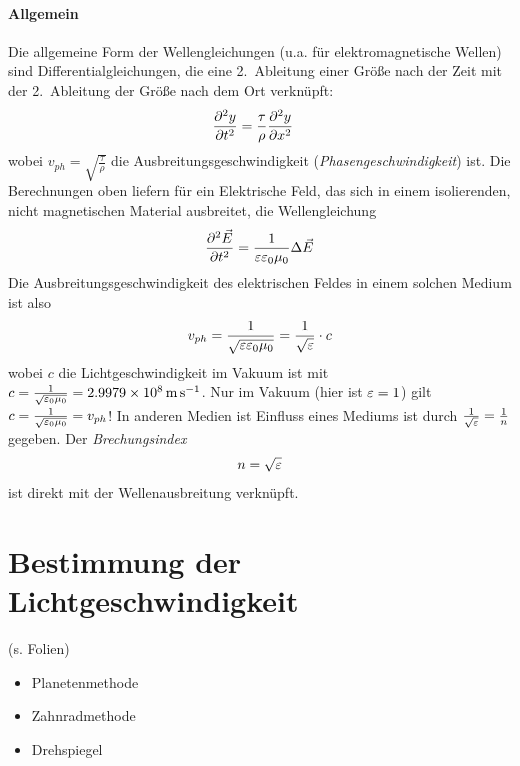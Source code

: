 \paragraph{Allgemein} 
Die allgemeine Form der Wellengleichungen (u.a. für elektromagnetische
Wellen) sind Differentialgleichungen, die eine 2.~Ableitung einer Größe nach der Zeit mit der
2.~Ableitung der Größe nach dem Ort verknüpft: 
\begin{align*}
  \diff[y]{t}&=\frac{\tau}{\rho}\diff[y]{x}
\end{align*}
wobei $v_{ph}=\sqrt{\frac{\tau}{\rho}}$ die Ausbreitungsgeschwindigkeit
(\emph{Phasengeschwindigkeit})%
%
%
ist. 
Die Berechnungen oben liefern für ein Elektrische Feld,
das sich in einem isolierenden, nicht magnetischen Material
ausbreitet, die Wellengleichung
\begin{gather}
  \diff[\vecE]{t} = \frac{1}{\varepsilon\varepsilon_0\mu_0} 
  \Delta \vecE
  \label{elektrWG}
\end{gather}
Die Ausbreitungsgeschwindigkeit des elektrischen Feldes in einem
solchen Medium ist also
\begin{gather*}
  v_{ph} = \frac{1}{\sqrt{\eps\epso\muo}}
  =\frac{1}{\sqrt{\eps}}\cdot c
\end{gather*}
wobei $c$ die Lichtgeschwindigkeit im Vakuum%
 ist mit
$c=\frac{1}{\sqrt{\epso\muo}}=\SI{2.9979e8}{\m\per\s}$.
 Nur im Vakuum (hier ist $\eps = 1$) gilt
$c=\frac{1}{\sqrt{\epso\muo}}=v_{ph}$!
In anderen Medien ist Einfluss eines Mediums ist durch
$\frac{1}{\sqrt{\eps}}=\frac{1}{n}$ gegeben. 
Der \emph{Brechungsindex} 
\begin{gather*}
  n=\sqrt{\eps}
\end{gather*}%
%
ist direkt mit der Wellenausbreitung verknüpft.

\section{Bestimmung der Lichtgeschwindigkeit}
(s. Folien)
\begin{itemize}
\item Planetenmethode
\item Zahnradmethode
\item Drehspiegel
\end{itemize}

